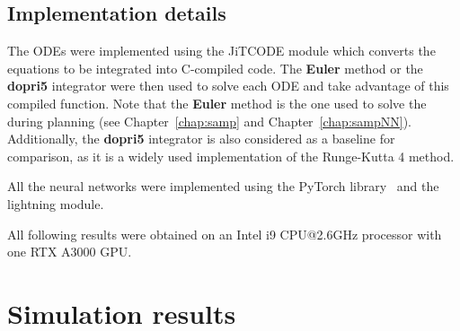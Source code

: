 
\subsection{Implementation details}

The ODEs were implemented using the JiTCODE \cite{cJit} module which converts the equations to be integrated into C-compiled code.
The \textbf{Euler} method or the \textbf{dopri5} integrator were then used to solve each ODE and take advantage of this compiled function.
Note that the \textbf{Euler} method is the one used to solve the  during planning (see Chapter~\ref{chap:samp} and Chapter~\ref{chap:sampNN}).
Additionally, the \textbf{dopri5} integrator is also considered as a baseline for comparison, as it is a widely used implementation of the Runge-Kutta 4 method.

All the neural networks were implemented using the PyTorch library~\cite{cPytorch} and the lightning module.

All following results were obtained on an Intel i9 CPU@2.6GHz processor with one RTX A3000 GPU. 

\section{Simulation results}\label{sec:nn_results}


